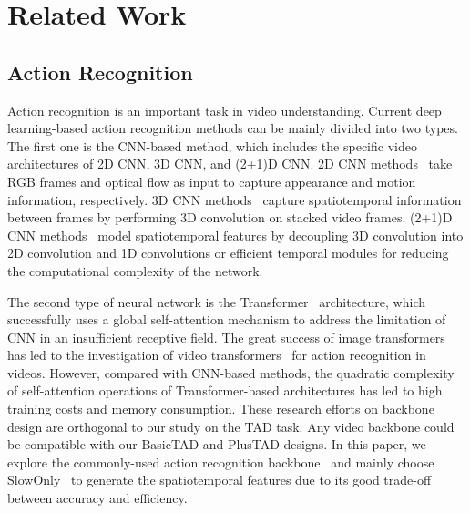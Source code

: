 \documentclass[a4paper,fleqn]{cas-dc}
\begin{document}
\section{Related Work}
\label{sec:relatedwork}
\subsection{Action Recognition}  
Action recognition is an important task in video understanding.
Current deep learning-based action recognition methods can be mainly divided into two types. The first one is the CNN-based method, which includes the specific video architectures of 2D CNN, 3D CNN, and (2+1)D CNN. 2D CNN methods~\citep{two-stream,tsn,tdn} take RGB frames and optical flow as input to capture appearance and motion information, respectively. 
3D CNN methods~\citep{c3d,r3d,i3d,artnet,r50-i3d-non-local,slowfast} capture spatiotemporal information between frames by performing 3D convolution on stacked video frames. (2+1)D CNN methods~\citep{p3d,s3d,r2+1d,tsm,teinet,tea,tam} model spatiotemporal features by decoupling 3D convolution into 2D convolution and 1D convolutions or efficient temporal modules for reducing the computational complexity of the network. 

The second type of neural network is the Transformer~\citep{transformer} architecture, which successfully uses a global self-attention mechanism to address the limitation of CNN in an insufficient receptive field. The great success of image transformers~\citep{vit,deit,swin-transformer} has led to the investigation of video transformers~\citep{timesformer,video-swin-transformer,vtn,vivit,videomae,VideoMAEv2} for action recognition in videos. 
However, compared with CNN-based methods, the quadratic complexity of self-attention operations of Transformer-based architectures has led to high training costs and memory consumption. These research efforts on backbone design are orthogonal to our study on the TAD task. Any video backbone could be compatible with our BasicTAD and PlusTAD designs. In this paper, we explore the commonly-used action recognition backbone~\citep{c3d,i3d,r50-i3d-non-local,slowfast} and mainly choose SlowOnly~\citep{slowfast} to generate the spatiotemporal features due to its good trade-off between accuracy and efficiency.
\end{document}
